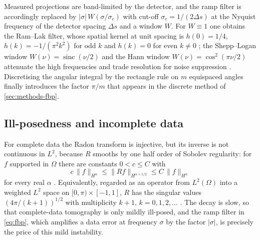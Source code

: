 \documentclass[11pt,a4paper]{article}
\numberwithin{equation}{section}
\theoremstyle{remark}
\begin{document}
Measured projections are band-limited by the detector, and the ramp filter is accordingly replaced by $|\sigma|\,W(\sigma/\sigma_c)$ with cut-off $\sigma_c=1/(2\Delta s)$ at the Nyquist frequency of the detector spacing $\Delta s$ and a window $W$. For $W\equiv1$ one obtains the Ram--Lak filter, whose spatial kernel at unit spacing is $h(0)=1/4$, $h(k)=-1/(\pi^2k^2)$ for odd $k$ and $h(k)=0$ for even $k\neq0$ \citep{kak2001}; the Shepp--Logan window $W(\nu)=\operatorname{sinc}(\nu/2)$ and the Hann window $W(\nu)=\cos^2(\pi\nu/2)$ attenuate the high frequencies and trade resolution for noise suppression \citep{shepp1974,kak2001}. Discretising the angular integral by the rectangle rule on $m$ equispaced angles finally introduces the factor $\pi/m$ that appears in the discrete method of \cref{sec:methods-fbp}.

\subsection{Ill-posedness and incomplete data}\label{sec:radon-illposed}

For complete data the Radon transform is injective, but its inverse is not continuous in $L^2$, because $R$ smooths by one half order of Sobolev regularity: for $f$ supported in $\Omega$ there are constants $0<c\le C$ with
\begin{equation}\label{eq:sobolev}
  c\,\|f\|_{H^\alpha}\le\|Rf\|_{H^{\alpha+1/2}}\le C\,\|f\|_{H^\alpha}
\end{equation}
for every real $\alpha$ \citep{natterer2001}. Equivalently, regarded as an operator from $L^2(\Omega)$ into a weighted $L^2$ space on $[0,\pi)\times[-1,1]$, $R$ has the singular values $(4\pi/(k+1))^{1/2}$ with multiplicity $k+1$, $k=0,1,2,\dots$ \citep{natterer2001,louis1984}. The decay is slow, so that complete-data tomography is only mildly ill-posed, and the ramp filter in \eqref{eq:fbp}, which amplifies a data error at frequency $\sigma$ by the factor $|\sigma|$, is precisely the price of this mild instability.
\end{document}
